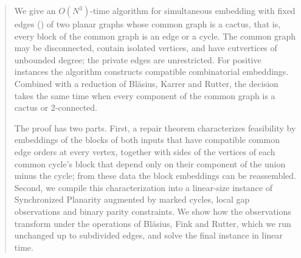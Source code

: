 \begin{abstract}
We give an $O(N^3)$-time algorithm for simultaneous embedding with fixed
edges (\sefe) of two planar graphs whose common graph is a cactus, that is,
every block of the common graph is an edge or a cycle. The common graph may
be disconnected, contain isolated vertices, and have cutvertices of
unbounded degree; the private edges are unrestricted. For positive
instances the algorithm constructs compatible combinatorial embeddings.
Combined with a reduction of Bl\"asius, Karrer and Rutter, the decision
takes the same time when every component of the common graph is a cactus or
$2$-connected.

The proof has two parts. First, a repair theorem characterizes feasibility
by embeddings of the blocks of both inputs that have compatible common edge
orders at every vertex, together with sides of the vertices of each common
cycle's block that depend only on their component of the union minus the
cycle; from these data the block embeddings can be reassembled. Second, we
compile this characterization into a linear-size instance of Synchronized
Planarity augmented by marked cycles, local gap observations and binary
parity constraints. We show how the observations transform under the
operations of Bl\"asius, Fink and Rutter, which we run unchanged up to
subdivided edges, and solve the final instance in linear time.
\end{abstract}
